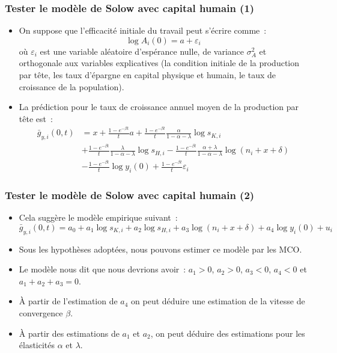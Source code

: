 \documentclass[10pt,notheorems]{beamer}
\theoremstyle{plain}
\theoremstyle{definition} %
\begin{document}
\begin{frame}
  \frametitle{Tester le modèle de Solow avec capital humain (1)}

  \begin{itemize}

  \item On suppose que l'efficacité initiale du travail peut s'écrire comme~:
    \[
      \log A_i(0) = a + \varepsilon_i
    \]
    où $\varepsilon_i$ est une variable aléatoire d'espérance nulle, de variance
    $\sigma_A^2$ et orthogonale aux variables explicatives (la condition
    initiale de la production par tête, les taux d'épargne en capital physique
    et humain, le taux de croissance de la population).\newline

  \item La prédiction pour le taux de croissance annuel
    moyen de la production par tête est~:
    {\small
    \[
      \begin{split}
        \bar g_{y,i}(0,t) &= x + \frac{1-e^{-\beta t}}{t} a + \frac{1-e^{-\beta t}}{t}\frac{\alpha}{1-\alpha-\lambda}\log s_{K,i} \\
                          &+ \frac{1-e^{-\beta t}}{t}\frac{\lambda}{1-\alpha-\lambda}\log s_{H,i} - \frac{1-e^{-\beta t}}{t}\frac{\alpha+\lambda}{1-\alpha-\lambda}\log (n_i+x+\delta)\\
                          &-\frac{1-e^{-\beta t}}{t} \log y_i(0) + \frac{1-e^{-\beta t}}{t} \varepsilon_i 
      \end{split}
    \]}
  \end{itemize}

\end{frame}


\begin{frame}
  \frametitle{Tester le modèle de Solow avec capital humain (2)}

  \begin{itemize}

  \item Cela suggère le modèle empirique suivant~:
    \[
      \bar g_{y,i}(0,t) = a_0 + a_1 \log s_{K,i} + a_2 \log s_{H,i} + a_3 \log (n_i+x+\delta) + a_4 \log y_i(0) + u_i 
    \]

    \medskip
    
  \item Sous les hypothèses adoptées, nous pouvons estimer ce modèle par les MCO.\newline

  \item Le modèle nous dit que nous devrions avoir~: $a_1>0$, $a_2>0$, $a_3<0$,
    $a_4<0$ et $a_1+a_2+a_3=0$.\newline

  \item À partir de l'estimation de $a_4$ on peut déduire une estimation de la vitesse de convergence $\beta$.\newline

  \item À partir des estimations de $a_1$ et $a_2$, on peut déduire des estimations pour les élasticités $\alpha$ et $\lambda$.
    
  \end{itemize}
\end{frame}
\end{document}
